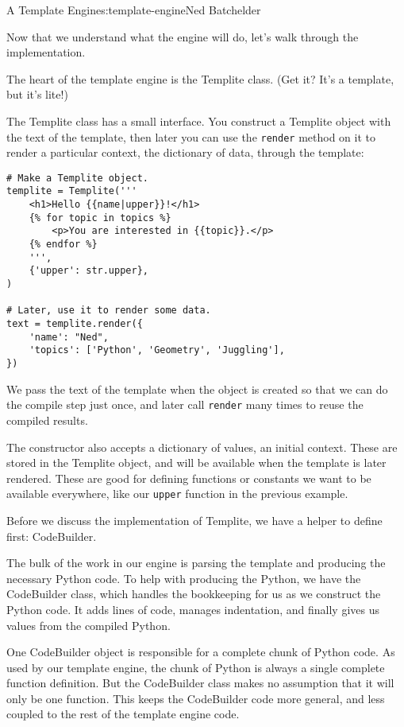 \begin{aosachapter}{A Template Engine}{s:template-engine}{Ned Batchelder}
\label{writing-the-engine}

Now that we understand what the engine will do, let's walk through the
implementation.

\label{the-templite-class}

The heart of the template engine is the Templite class. (Get it? It's a
template, but it's lite!)

The Templite class has a small interface. You construct a Templite
object with the text of the template, then later you can use the
\texttt{render} method on it to render a particular context, the
dictionary of data, through the template:

\begin{verbatim}
# Make a Templite object.
templite = Templite('''
    <h1>Hello {{name|upper}}!</h1>
    {% for topic in topics %}
        <p>You are interested in {{topic}}.</p>
    {% endfor %}
    ''',
    {'upper': str.upper},
)

# Later, use it to render some data.
text = templite.render({
    'name': "Ned",
    'topics': ['Python', 'Geometry', 'Juggling'],
})
\end{verbatim}

We pass the text of the template when the object is created so that we
can do the compile step just once, and later call \texttt{render} many
times to reuse the compiled results.

The constructor also accepts a dictionary of values, an initial context.
These are stored in the Templite object, and will be available when the
template is later rendered. These are good for defining functions or
constants we want to be available everywhere, like our \texttt{upper}
function in the previous example.

Before we discuss the implementation of Templite, we have a helper to
define first: CodeBuilder.

\label{codebuilder}

The bulk of the work in our engine is parsing the template and producing
the necessary Python code. To help with producing the Python, we have
the CodeBuilder class, which handles the bookkeeping for us as we
construct the Python code. It adds lines of code, manages indentation,
and finally gives us values from the compiled Python.

One CodeBuilder object is responsible for a complete chunk of Python
code. As used by our template engine, the chunk of Python is always a
single complete function definition. But the CodeBuilder class makes no
assumption that it will only be one function. This keeps the CodeBuilder
code more general, and less coupled to the rest of the template engine
code.


\end{aosachapter}
